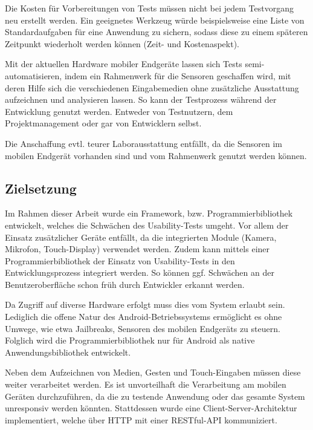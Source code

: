 Die Kosten für Vorbereitungen von Tests müssen nicht bei jedem Testvorgang neu erstellt werden. Ein geeignetes Werkzeug würde beispielsweise eine Liste von Standardaufgaben für eine Anwendung zu sichern, sodass diese zu einem späteren Zeitpunkt wiederholt werden können (Zeit- und Kostenaspekt). 

Mit der aktuellen Hardware mobiler Endgeräte lassen sich Tests semi-automatisieren, indem ein Rahmenwerk für die Sensoren geschaffen wird, mit deren Hilfe sich die verschiedenen Eingabemedien ohne zusätzliche Ausstattung aufzeichnen und analysieren lassen. 
So kann der Testprozess während der Entwicklung genutzt werden. 
Entweder von Testnutzern, dem Projektmanagement oder gar von Entwicklern selbst. 

Die Anschaffung evtl. teurer Laborausstattung entfällt, da die Sensoren im mobilen Endgerät vorhanden sind und vom Rahmenwerk genutzt werden können. 

\subsection{Zielsetzung \label{sec: zielsetzung}}

Im Rahmen dieser Arbeit wurde ein Framework, bzw. Programmierbibliothek entwickelt, welches die Schwächen des Usability-Tests umgeht. 
Vor allem der Einsatz zusätzlicher Geräte entfällt, da die integrierten Module (Kamera, Mikrofon, Touch-Display) verwendet werden. 
Zudem kann mittels einer Programmierbibliothek der Einsatz von Usability-Tests in den Entwicklungsprozess integriert werden. 
So können ggf. Schwächen an der Benutzeroberfläche schon früh durch Entwickler erkannt werden.

Da Zugriff auf diverse Hardware erfolgt muss dies vom System erlaubt sein. 
Lediglich die offene Natur des Android-Betriebssystems ermöglicht es ohne Umwege, wie etwa Jailbreaks, Sensoren des mobilen Endgeräts zu steuern. 
Folglich wird die Programmierbibliothek nur für Android als native Anwendungsbibliothek entwickelt. 

Neben dem Aufzeichnen von Medien, Gesten und Touch-Eingaben müssen diese weiter verarbeitet werden. 
Es ist unvorteilhaft die Verarbeitung am mobilen Geräten durchzuführen, da die zu testende Anwendung oder das gesamte System unresponsiv werden könnten. 
Stattdessen wurde eine Client-Server-Architektur implementiert, welche über \ac{HTTP} mit einer RESTful-API kommuniziert. 

